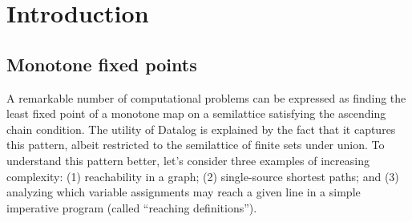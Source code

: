 \chapter{Introduction}
\label{chapter-introduction}


\section{Monotone fixed points}
\label{section-monotone-fixed-points}


A remarkable number of computational problems can be expressed as finding the
least fixed point of a monotone map on a semilattice satisfying the ascending
chain condition.
%
The utility of Datalog is explained by the fact that it captures this pattern,
albeit restricted to the semilattice of finite sets under union.
%
To understand this pattern better, let's consider three examples of increasing
complexity:
%
(1) reachability in a graph;
(2) single-source shortest paths;
and (3) analyzing which variable assignments may reach a given line in a simple
imperative program (called ``reaching definitions'').



